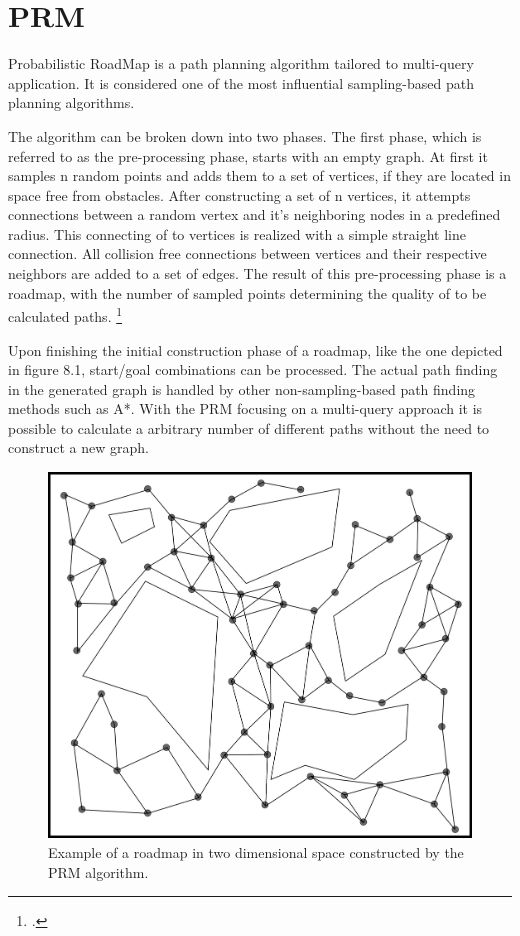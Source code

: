 \section{PRM}

Probabilistic RoadMap is a path planning algorithm tailored to multi-query application. It is considered one of the most influential sampling-based path planning algorithms. 

The algorithm can be broken down into two phases. The first phase, which is referred to as the pre-processing phase, starts with an empty graph. At first it samples n random points and adds them to a set of vertices, if they are located in space free from obstacles. After constructing a set of n vertices, it attempts connections between a random vertex and it's neighboring nodes in a predefined radius. This connecting of to vertices is realized with a simple straight line connection. All collision free connections between vertices and their respective neighbors are added to a set of edges. The result of this pre-processing phase is a roadmap, with the number of sampled points determining the quality of to be calculated paths. 
\footcite{Karaman2011}

Upon finishing the initial construction phase of a roadmap, like the one depicted in figure 8.1, start/goal combinations can be processed. 
The actual path finding in the generated graph is handled by other non-sampling-based path finding methods such as A*.\newline
With the PRM focusing on a multi-query approach it is possible to calculate a arbitrary number of different paths without the need to construct a new graph.

\begin{figure}[h]
	\centering
	\includegraphics[width=0.7\linewidth]{img/PRMRoadmap}
	\caption{Example of a roadmap in two dimensional space constructed by the PRM algorithm.}
	\label{fig:path_planning_prm}
\end{figure}

